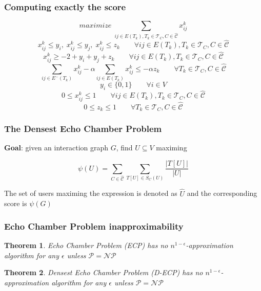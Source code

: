 \documentclass{beamer}
\newtheorem{theorem}{Theorem}
\begin{document}
\begin{frame}[c]
	\frametitle{Computing exactly the score}

	\begin{equation}
		maximize\; \sum_{ij \in E(T_{k}), T_{k} \in \mathcal{T}_{C}, C \in
			\mathcal{\hat{C}} } x_{ij} ^{k}
	\end{equation}
	\begin{equation}
		x _{ij}^{k}  \leq y_i, \; x _{ij} ^{k} \leq y_j, \;x _{ij}^{k}  \leq z_k \quad\quad \forall ij \in E(T_{k}), T_{k} \in
		\mathcal{T}_{C}, C \in \mathcal{\hat{C}}
	\end{equation}
	\begin{equation}
		x _{ij} ^{k} \geq - 2 + y_i + y_j + z_k \quad\quad \forall ij \in E(T_k), T_k \in \mathcal{T} _{C}, C \in \hat{\mathcal{C} }
	\end{equation}
	\begin{equation}
		\sum^{}_{ij \in E^{-} (T_k)} x_{ij}^{k}  - \alpha \sum^{}_{ij \in E(T_k)}
		x_{ij} ^{k}  \leq - \alpha z_k \quad\quad \forall T_{k} \in \mathcal{T} _{C}, C \in
		\hat{\mathcal{C}}
	\end{equation}
	\begin{equation}
		y _{i} \in  \{0, 1\} \quad\quad \forall i \in V
	\end{equation}
	\begin{equation}
		0 \leq x _{ij} ^{k}  \leq 1 \quad\quad \forall ij \in E(T_{k}), T_{k} \in
		\mathcal{T}_{C}, C \in \mathcal{\hat{C}}
	\end{equation}
	\begin{equation}
		0 \leq z _{k} \leq 1 \quad\quad \forall T_{k} \in \mathcal{T} _{C}, C \in
		\hat{\mathcal{C}}
	\end{equation}
\end{frame}

\begin{frame}[c]
	\frametitle{The Densest Echo Chamber Problem}
	\textbf{Goal}: given an interaction graph $G$, find $U \subseteq V$ maximing

	\begin{equation}
		\psi (U) = \sum^{}_{C \in \hat{\mathcal{C}} } \sum^{}_{T[U] \in S_C (U)}
		\frac{| T[U] |}{|U|}
	\end{equation}

	The set of users maximing the expression is denoted as $\hat{U}$ and the
	corresponding score is $\psi(G)$
\end{frame}

\begin{frame}[c]
	\frametitle{Echo Chamber Problem inapproximability}
	\begin{theorem}
		\label{th:approximability}
		Echo Chamber Problem (ECP) has no $n^{1-\epsilon} $-approximation algorithm for
		any $\epsilon$ unless $\mathcal{P} = \mathcal{NP}  $
	\end{theorem}

	\begin{theorem}
		\label{th:approximability}
		Densest Echo Chamber Problem (D-ECP) has no $n^{1-\epsilon} $-approximation algorithm for
		any $\epsilon$ unless $\mathcal{P} = \mathcal{NP}  $
	\end{theorem}
\end{frame}
\end{document}
